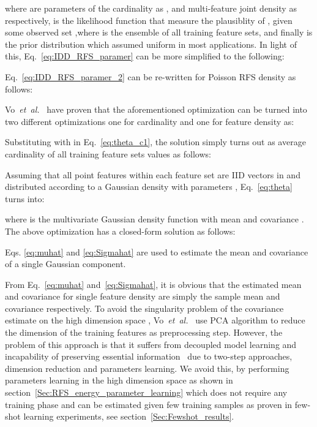 \documentclass[journal]{IEEEtran}
\newcommand \andothers {\textit{et~al.}}
\begin{document}
where  are parameters of the cardinality as , and multi-feature joint density as  respectively,   is the likelihood function that measure the plausiblity of , given some observed set ,where  is the ensemble of all training feature sets,  and finally  is the prior distribution which assumed uniform in most applications. In light of this, Eq.~\ref{eq:IDD_RFS_paramer} can be more simplified to the following:


Eq.~\ref{eq:IDD_RFS_paramer_2} can be re-written for Poisson RFS density as follows:


Vo~\andothers~\cite{vo2018model} have proven that the aforementioned optimization can be turned into two different optimizations one for cardinality and one for feature density as:

Substituting  with  in Eq.~\ref{eq:theta_c1}, the solution simply turns out as average cardinality of all training feature sets values as follows:

Assuming that all point features within each feature set are IID vectors in  and distributed according to a Gaussian density with parameters , Eq.~\eqref{eq:theta} turns into:

where  is the multivariate Gaussian density function with mean  and covariance . The above optimization has a closed-form solution as follows:

Eqs. \eqref{eq:muhat} and \eqref{eq:Sigmahat} are used to estimate the mean and covariance of a single Gaussian component.

From Eq.~\ref{eq:muhat} and~\ref{eq:Sigmahat}, it is obvious that the estimated mean  and covariance  for single feature density are simply the sample mean and covariance respectively. 
To avoid the singularity problem of the covariance estimate on the high dimension space  , Vo~\andothers~\cite{vo2018model} use PCA algorithm to reduce the dimension of the training features as preprocessing step. However, the problem of this approach is that it suffers from decoupled model learning and incapability of preserving essential information~\cite{zong2018deep} due to two-step approaches, dimension reduction and parameters learning. We avoid this, by performing parameters learning in the high dimension space as shown in section~\ref{Sec:RFS_energy_parameter_learning} which does not require any training phase and can be estimated given few training samples as proven in few-shot learning experiments, see section~\ref{Sec:Fewshot_results}.
\end{document}
